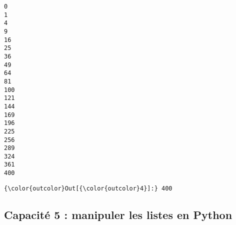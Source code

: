 \documentclass[11pt]{article}
\begin{document}
    \begin{Verbatim}[commandchars=\\\{\}]
0
1
4
9
16
25
36
49
64
81
100
121
144
169
196
225
256
289
324
361
400

    \end{Verbatim}

\begin{Verbatim}[commandchars=\\\{\}]
{\color{outcolor}Out[{\color{outcolor}4}]:} 400
\end{Verbatim}
            
    \subsection{Capacité 5 : manipuler les listes en
Python}\label{capacituxe9-5-manipuler-les-listes-en-python}
\end{document}
